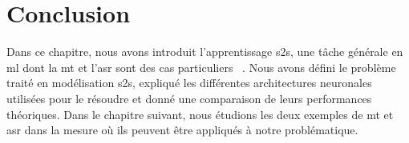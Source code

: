 \section{Conclusion}

Dans ce chapitre, nous avons introduit l'apprentissage \gls{s2s}, 
une tâche générale en \gls{ml} dont la \gls{mt} et l'\gls{asr} sont des cas particuliers%
~\cite{Szabo_Plesiak_Yang_Heumann}.
Nous avons défini le problème traité en modélisation \gls{s2s},
expliqué les différentes architectures neuronales utilisées pour le résoudre
et donné une comparaison de leurs performances théoriques.
Dans le chapitre suivant, nous étudions les deux exemples de \gls{mt} et \gls{asr}
dans la mesure où ils peuvent être appliqués à notre problématique.